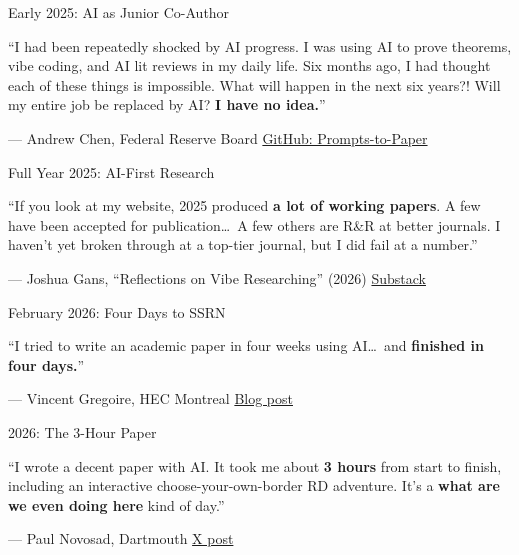 \documentclass[aspectratio=169, 11pt]{beamer}
\newcommand{\emphgold}[1]{\alert{\textbf{#1}}}
\newcommand{\sourceref}[1]{\vspace{0.15cm}\hfill{\tiny\textcolor{medgray}{#1}}}
\begin{document}
\begin{frame}{Early 2025: AI as Junior Co-Author}
\vfill
\begin{bigquote}
\large
``I had been repeatedly shocked by AI progress. I was using AI to prove theorems, vibe coding, and AI lit reviews in my daily life. Six months ago, I had thought each of these things is impossible. What will happen in the next six years?! Will my entire job be replaced by AI? \emphgold{I have no idea.}''
\end{bigquote}
\vspace{0.5cm}
\hfill\textcolor{medgray}{\normalsize --- Andrew Chen, Federal Reserve Board}
\sourceref{\href{https://github.com/chenandrewy/Prompts-to-Paper}{GitHub: Prompts-to-Paper}}
\vfill
\end{frame}

\begin{frame}{Full Year 2025: AI-First Research}
\vfill
\begin{bigquote}
\large
``If you look at my website, 2025 produced \emphgold{a lot of working papers}. A few have been accepted for publication\ldots\ A few others are R\&R at better journals. I haven't yet broken through at a top-tier journal, but I did fail at a number.''
\end{bigquote}
\vspace{0.5cm}
\hfill\textcolor{medgray}{\normalsize --- Joshua Gans, ``Reflections on Vibe Researching'' (2026)}
\sourceref{\href{https://joshuagans.substack.com/p/reflections-on-vibe-researching}{Substack}}
\vfill
\end{frame}

\begin{frame}{February 2026: Four Days to SSRN}
\vfill
\begin{bigquote}
\Large
``I tried to write an academic paper in four weeks using AI\ldots\ and \emphgold{finished in four days.}''
\end{bigquote}
\vspace{0.5cm}
\hfill\textcolor{medgray}{\normalsize --- Vincent Gregoire, HEC Montreal}
\sourceref{\href{https://vincent.codes.finance/posts/vibe-research-paper/}{Blog post}}
\vfill
\end{frame}

\begin{frame}{2026: The 3-Hour Paper}
\vfill
\begin{bigquote}
\Large
``I wrote a decent paper with AI. It took me about \emphgold{3 hours} from start to finish, including an interactive choose-your-own-border RD adventure. It's a \emphgold{what are we even doing here} kind of day.''
\end{bigquote}
\vspace{0.5cm}
\hfill\textcolor{medgray}{\normalsize --- Paul Novosad, Dartmouth}
\sourceref{\href{https://x.com/paulnovosad/status/2021655122351468684}{X post}}
\vfill
\end{frame}
\end{document}
